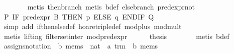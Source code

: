 \begin{isabellebody}
\ \ \ \ \ \ \isamarkupfalse%
\ {}metis\ then{}branch{}\ {}metis\ b{}def\ else{}branch\ pred{}expr{}not{}\isanewline
\ \ \ \ \isamarkupfalse%
\ {}{}P{}\ IF\ pred{}expr\ B\ THEN\ p\ ELSE\ q\ ENDIF\ {}Q{}{}\isanewline
\ \ \ \ \ \ \isamarkupfalse%
\ {}simp\ add{}\ if{}then{}else{}def\ hoare{}triple{}def\ mod{}plus\ mod{}mult{}\isanewline
\ \ \ \ \ \ \isamarkupfalse%
\ {}metis\ {}lifting{}\ filter{}set{}inter\ mod{}pred{}expr{}\isanewline
\ \ \ \ \isamarkupfalse%
\ {}thesis\isanewline
\ \ \ \ \ \ \isamarkupfalse%
\ {}metis\ b{}def{}\isanewline
\ \ \isamarkupfalse%
%
\endisatagproof
{\isafoldproof}%
%
\isadelimproof
\isanewline
%
\endisadelimproof
\isanewline
\ \ \isamarkupfalse%
\ assigns{}notation\ {}{}\ {}{}b\ mems\ {}\ nat\ {}\ {}a\ trm\ {}\ {}b\ mems{}\isanewline

\end{isabellebody}
